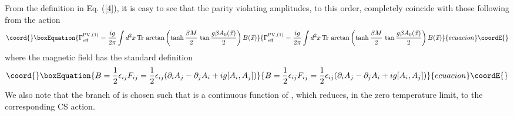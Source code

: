 \documentclass[a4paper,12pt]{article}
\begin{document}
From the definition in Eq. (\ref{4}), it is easy to see that the
parity violating amplitudes, to this order, completely
coincide with those following from the action
\begin{equation}\coord{}\boxEquation{
\Gamma_{\rm eff}^{{\rm PV}, (1)} = {ig\over 2\pi} \int d^{2}x\,{\rm
  Tr}\,\arctan\left(\tanh {\beta M\over 2}\,\tan {g\beta A_{0}(\vec{x})\over
  2}\right) B(\vec{x})\label{8}
}{
\Gamma_{\rm eff}^{{\rm PV}, (1)} = {ig\over 2\pi} \int d^{2}x\,{\rm
  Tr}\,\arctan\left(\tanh {\beta M\over 2}\,\tan {g\beta A_{0}(\vec{x})\over
  2}\right) B(\vec{x})}{ecuacion}\coordE{}\end{equation}
where the magnetic field has the standard definition
\begin{equation}\coord{}\boxEquation{
B = {1\over 2} \epsilon_{ij}F_{ij} = {1\over 2} \epsilon_{ij}
(\partial_{i}A_{j}-\partial_{j}A_{i} + ig[A_{i},A_{j}])\label{9}
}{
B = {1\over 2} \epsilon_{ij}F_{ij} = {1\over 2} \epsilon_{ij}
(\partial_{i}A_{j}-\partial_{j}A_{i} + ig[A_{i},A_{j}])}{ecuacion}\coordE{}\end{equation}
We also note that the branch of \myHighlight{$\arctan$}\coordHE{} is chosen such that
\coordHE{} is a continuous function
of \coordHE{}, which reduces, in the zero temperature limit, to
the corresponding CS action.
\end{document}
